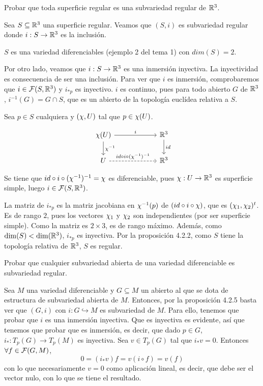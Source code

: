 \documentclass[twoside]{article}
\newcounter{ejercicio}
\begin{document}
\begin{ejercicio}{6}
Probar que toda superficie regular es una subvariedad regular de $\mathbb{R}^3$.
\end{ejercicio}
\begin{solucion}
Sea $S \subseteq \mathbb{R}^3$ una superficie regular. Veamos que $(S,i)$ es subvariedad regular donde $i : S \to \mathbb{R}^3$ es la inclusión.

$S$ es una variedad diferenciables (ejemplo 2 del tema 1) con $dim(S)=2$.

Por otro lado, veamos que $i : S \to \mathbb{R}^3$ es una inmersión inyectiva. La inyectividad es consecuencia de ser una inclusión. Para ver que $i$ es inmersión, comprobaremos que $i \in \mathcal{F}(S,\mathbb{R}^3)$ y $i_{*p}$ es inyectivo. $i$ es continuo, pues para todo abierto $G$ de $\mathbb{R}^3$, $i^{-1}(G) = G \cap S$, que es un abierto de la topología euclídea relativa a $S$.

Sea $p \in S$ cualquiera y $(\chi,U)$ tal que $p \in \chi(U)$.

\[
\begin{tikzcd}
	{\X(U)} \ar[d,"\X^{-1}"] \ar[rr,"i"] & \ & {\R^3} \ar[d,"id"] \\
	U \ar[rr,dashrightarrow, "id\circ i \circ (\X^{-1})^{-1}"] & \ & {\R^3}
\end{tikzcd}
\]

Se tiene que $id \circ i \circ (\chi^{-1})^{-1} = \chi$ es diferenciable, pues $\chi : U \to \mathbb{R}^3$ es superficie simple, luego $i \in \mathcal{F}(S,\mathbb{R}^3)$.

La matriz de $i_{*p}$ es la matriz jacobiana en $\chi^{-1}(p)$ de $(id \circ i \circ \chi)$, que es $(\chi_1, \chi_2)^t$. Es de rango $2$, pues los vectores $\chi_1$ y $\chi_2$ son independientes (por ser superficie simple). Como la matriz es $2\times 3$, es de rango máximo. Además, como $\dim(S) < \dim(\mathbb{R}^3)$, $i_{*p}$ es inyectiva. Por la proposición 4.2.2, como $S$ tiene la topología relativa de $\mathbb{R}^3$, $S$ es regular.
\end{solucion}

\newpage

\begin{ejercicio}{7}
Probar que cualquier subvariedad abierta de una variedad diferenciable es
subvariedad regular.
\end{ejercicio}
\begin{solucion}
Sea $M$ una variedad diferenciable y $G\subseteq M$ un abierto al que se dota de estructura de subvariedad abierta de $M$. Entonces, por la proposición 4.2.5 basta ver que $(G,i)$ con $i:G\hookrightarrow M$ es subvariedad de $M$. Para ello, tenemos que probar que $i$ es una inmersión inyectiva. Que es inyectiva es evidente, así que tenemos que probar que es inmersión, es decir, que dado $p\in G$, $i_*:T_p(G)\to T_p(M)$ es inyectiva. Sea $v\in T_p(G)$ tal que $i_*v=0$. Entonces $\forall f\in\mathcal{F}(G,M)$, 
$$0=(i_*v)f =v(i\circ f)=v(f)$$
con lo que necesariamente $v=0$ como aplicación lineal, es decir, que debe ser el vector nulo, con lo que se tiene el resultado.
\end{solucion}
\end{document}
